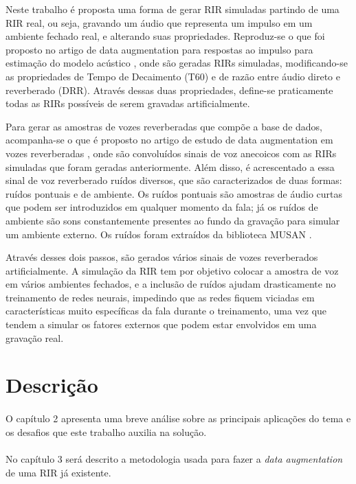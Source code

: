 Neste trabalho é proposta uma forma de gerar RIR simuladas partindo de uma RIR real, ou seja, gravando um áudio que representa um impulso em um ambiente
fechado real, e alterando suas propriedades. Reproduz-se o que foi proposto no artigo de data augmentation para respostas ao impulso para
estimação do modelo acústico \cite{RIR_Data_Aug}, onde são geradas RIRs simuladas, modificando-se as propriedades de Tempo de Decaimento (T60) e de
razão entre áudio direto e reverberado (DRR). Através dessas duas propriedades, define-se praticamente todas as RIRs possíveis de serem gravadas
artificialmente.

Para gerar as amostras de vozes reverberadas que compõe a base de dados, acompanha-se o que é proposto no artigo de estudo de data
augmentation em vozes reverberadas \cite{Speech_Rec}, onde são convoluídos sinais de voz anecoicos com as RIRs simuladas que foram geradas anteriormente.
Além disso, é acrescentado a essa sinal de voz reverberado ruídos diversos, que são caracterizados de duas formas: ruídos pontuais e de ambiente.
Os ruídos pontuais são amostras de áudio curtas que podem ser introduzidos em qualquer momento da fala; já os ruídos de ambiente são sons constantemente
presentes ao fundo da gravação para simular um ambiente externo. Os ruídos foram extraídos da biblioteca MUSAN \cite{noiseLib}.

Através desses dois passos, são gerados vários sinais de vozes reverberados artificialmente. A simulação da RIR tem por objetivo colocar
a amostra de voz em vários ambientes fechados, e a inclusão de ruídos ajudam drasticamente no treinamento de redes neurais, impedindo que as redes fiquem
viciadas em características muito específicas da fala durante o treinamento, uma vez que tendem a simular 
os fatores externos que podem estar envolvidos em uma gravação real.


\section{Descrição}

\paragraph{}O capítulo 2 apresenta uma breve análise sobre as principais aplicações do tema e os desafios que este trabalho auxilia na solução.

\paragraph{}No capítulo 3 será descrito a metodologia usada para fazer a \textit{data augmentation} de uma RIR já existente.


